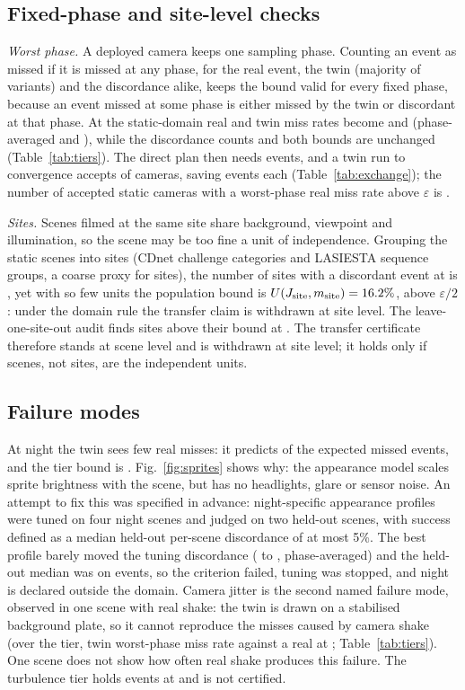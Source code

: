 \subsection{Fixed-phase and site-level checks}\label{sec:checks}
\emph{Worst phase.} A deployed camera keeps one sampling phase. Counting an event as missed if it is missed at any
phase, for the real event, the twin (majority of variants) and the discordance alike, keeps the bound valid for every
fixed phase, because an event missed at some phase is either missed by the twin or discordant at that phase. At \OPs{}
the static-domain real and twin miss rates become \nWPSpMain{} and \nWPSqMain{} (phase-averaged \nPASpMain{} and
\nPASqMain), while the discordance counts and both bounds are unchanged (Table~\ref{tab:tiers}). The direct plan then
needs \nWXSnd{} events, and a twin run to convergence accepts \nWXSacc{} of \nMainScenes{} cameras, saving \nWXSsaved{}
events each (Table~\ref{tab:exchange}); the number of accepted static cameras with a worst-phase real miss rate above
$\varepsilon$ is \nWXSfa.

\emph{Sites.} Scenes filmed at the same site share background, viewpoint and illumination, so the scene may be too fine
a unit of independence. Grouping the static scenes into \nSiteSm{} sites (CDnet challenge categories and LASIESTA
sequence groups, a coarse proxy for sites), the number of sites with a discordant event at \OPs{} is \nSiteSJ, yet
with so few units the population bound is $U(J_{\mathrm{site}},m_{\mathrm{site}})=16.2\%$, above $\varepsilon/2$:
under the domain rule the transfer claim is withdrawn at site level. The leave-one-site-out audit finds \nSiteSloso{}
sites above their bound at \OPs. The transfer certificate therefore stands at scene level and is withdrawn at site level; it holds only if
scenes, not sites, are the independent units.

\subsection{Failure modes}
At night the twin sees few real misses: it predicts \nRecallNight{} of the expected missed events, and the tier bound is
\nNightUpop. Fig.~\ref{fig:sprites} shows why: the appearance model scales sprite brightness with the scene, but has no
headlights, glare or sensor noise. An attempt to fix this was specified in advance: night-specific appearance profiles were
tuned on four night scenes and judged on two held-out scenes, with success defined as a median held-out per-scene
discordance of at most 5\%. The best profile barely moved the tuning discordance (\nNightBaseD{} to \nNightProfD,
phase-averaged) and the held-out median was \nNightHeldD{} on \nNightHeldN{} events, so the criterion failed, tuning was
stopped, and night is declared outside the domain. Camera jitter is the second named failure mode, observed in one
scene with real shake: the twin is drawn on a stabilised background plate, so it cannot reproduce the misses caused by
camera shake (over the tier, twin worst-phase miss rate \nWPSqJit{} against a real \nWPSpJit{} at \OPs;
Table~\ref{tab:tiers}). One scene does not show how often real shake produces this failure. The turbulence tier holds
\nTurbN{} events at \OPs{} and is not certified.

